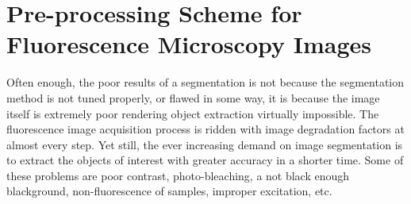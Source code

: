
\chapter{Pre-processing Scheme for Fluorescence Microscopy Images} %

\label{chap:Chapter4} %



Often enough, the poor results of a segmentation is not because the segmentation method is not tuned properly, or flawed in some way, it is because the image itself is extremely poor rendering object extraction virtually impossible. 
The fluorescence image acquisition process is ridden with image degradation factors at almost every step.
Yet still, the ever increasing demand on image segmentation is to extract the objects of interest with greater accuracy in a shorter time.
Some of these problems are poor contrast, photo-bleaching, a not black enough blackground, non-fluorescence of samples, improper excitation, etc.

